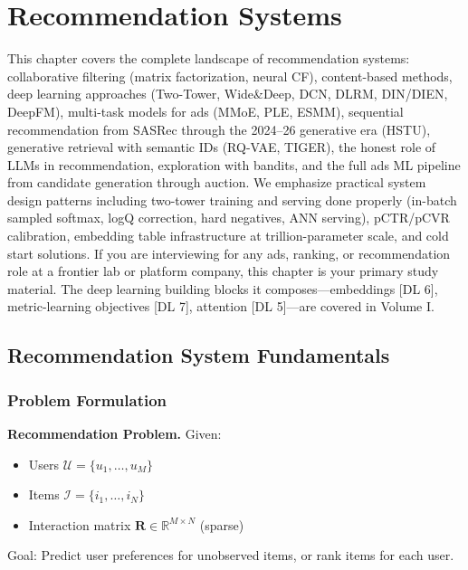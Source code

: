 \chapter{Recommendation Systems}
\label{sr:chap:recommendation_systems}

\begin{tldr}
This chapter covers the complete landscape of recommendation systems: collaborative filtering (matrix factorization, neural CF), content-based methods, deep learning approaches (Two-Tower, Wide\&Deep, DCN, DLRM, DIN/DIEN, DeepFM), multi-task models for ads (MMoE, PLE, ESMM), sequential recommendation from SASRec through the 2024--26 generative era (HSTU), generative retrieval with semantic IDs (RQ-VAE, TIGER), the honest role of LLMs in recommendation, exploration with bandits, and the full ads ML pipeline from candidate generation through auction. We emphasize practical system design patterns including two-tower training and serving done properly (in-batch sampled softmax, logQ correction, hard negatives, ANN serving), pCTR/pCVR calibration, embedding table infrastructure at trillion-parameter scale, and cold start solutions. If you are interviewing for any ads, ranking, or recommendation role at a frontier lab or platform company, this chapter is your primary study material. The deep learning building blocks it composes---embeddings [DL 6], metric-learning objectives [DL 7], attention [DL 5]---are covered in Volume I.
\end{tldr}

\section{Recommendation System Fundamentals}
\label{sr:sec:recsys_fundamentals}

\subsection{Problem Formulation}

\textbf{Recommendation Problem.} Given:
\begin{itemize}
    \item Users $\mathcal{U} = \{u_1, \ldots, u_M\}$
    \item Items $\mathcal{I} = \{i_1, \ldots, i_N\}$
    \item Interaction matrix $\mathbf{R} \in \mathbb{R}^{M \times N}$ (sparse)
\end{itemize}
Goal: Predict user preferences for unobserved items, or rank items for each user.


